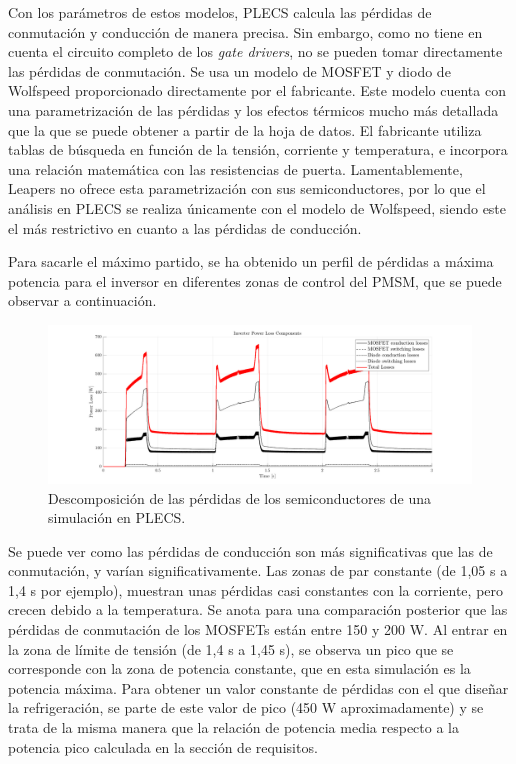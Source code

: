 Con los parámetros de estos modelos, PLECS calcula las pérdidas de conmutación y conducción de manera precisa. Sin embargo, como no tiene en cuenta el circuito completo de los \textit{gate drivers}, no se pueden tomar directamente las pérdidas de conmutación. Se usa un modelo de MOSFET y diodo de Wolfspeed proporcionado directamente por el fabricante. Este modelo cuenta con una parametrización de las pérdidas y los efectos térmicos mucho más detallada que la que se puede obtener a partir de la hoja de datos. El fabricante utiliza tablas de búsqueda en función de la tensión, corriente y temperatura, e incorpora una relación matemática con las resistencias de puerta. Lamentablemente, Leapers no ofrece esta parametrización con sus semiconductores, por lo que el análisis en PLECS se realiza únicamente con el modelo de Wolfspeed, siendo este el más restrictivo en cuanto a las pérdidas de conducción.

Para sacarle el máximo partido, se ha obtenido un perfil de pérdidas a máxima potencia para el inversor en diferentes zonas de control del PMSM, que se puede observar a continuación.

\begin{figure}[H]
	\centering
	\includegraphics[width=0.9\linewidth]{fig/PLECS-invLosses}
	\caption{Descomposición de las pérdidas de los semiconductores de una simulación en PLECS.}
	\label{losses-sim}
\end{figure}

Se puede ver como las pérdidas de conducción son más significativas que las de conmutación, y varían significativamente. Las zonas de par constante (de 1,05 s a 1,4 s por ejemplo), muestran unas pérdidas casi constantes con la corriente, pero crecen debido a la temperatura. Se anota para una comparación posterior que las pérdidas de conmutación de los MOSFETs están entre 150 y 200 W. Al entrar en la zona de límite de tensión (de 1,4 s a 1,45 s), se observa un pico que se corresponde con la zona de potencia constante, que en esta simulación es la potencia máxima. Para obtener un valor constante de pérdidas con el que diseñar la refrigeración, se parte de este valor de pico (450 W aproximadamente) y se trata de la misma manera que la relación de potencia media respecto a la potencia pico calculada en la sección de requisitos.

